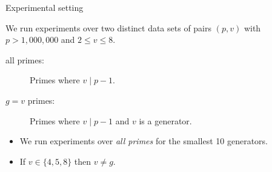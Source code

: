 
\begin{frame}{Experimental setting}

    We run experiments over two distinct data sets of pairs $(p, v)$ with $p > 1,000,000$ and $2 \leq v \leq 8$.
    
    \begin{description}
        \item[all primes:] Primes where $v \mid p -1$.
        \item[$g = v$ primes:] Primes where $v \mid p -1$ and $v$ is a generator.
    \end{description}

    \pause
    
    
    \begin{itemize}
        \item We run experiments over \emph{all primes} for the smallest 10 generators.
        \item If $v\in\{4,5,8\}$ then $v\neq g$.
    \end{itemize}
\end{frame}


